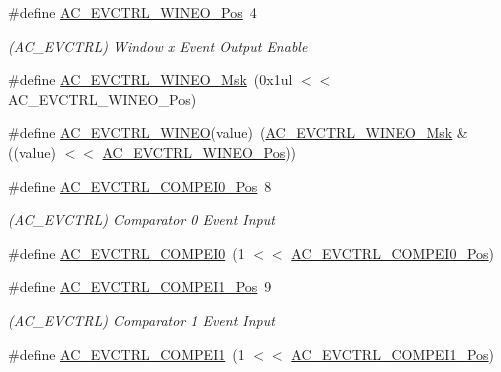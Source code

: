 \begin{DoxyCompactItemize}
\#define \mbox{\hyperlink{group___s_a_m_d21___a_c_ga1afab4ba445e18743d95471ac63fc5f3}{A\+C\+\_\+\+E\+V\+C\+T\+R\+L\+\_\+\+W\+I\+N\+E\+O\+\_\+\+Pos}}~4
\begin{DoxyCompactList}\small\item\em (A\+C\+\_\+\+E\+V\+C\+T\+RL) Window x Event Output Enable \end{DoxyCompactList}\item 
\#define \mbox{\hyperlink{group___s_a_m_d21___a_c_gacaf33f5e882907efaa5d1796b80c8eb8}{A\+C\+\_\+\+E\+V\+C\+T\+R\+L\+\_\+\+W\+I\+N\+E\+O\+\_\+\+Msk}}~(0x1ul $<$$<$ A\+C\+\_\+\+E\+V\+C\+T\+R\+L\+\_\+\+W\+I\+N\+E\+O\+\_\+\+Pos)
\item 
\#define \mbox{\hyperlink{group___s_a_m_d21___a_c_gaa9bf3767e1890a5777a9299e4fc7e812}{A\+C\+\_\+\+E\+V\+C\+T\+R\+L\+\_\+\+W\+I\+N\+EO}}(value)~(\mbox{\hyperlink{group___s_a_m_d21___a_c_gacaf33f5e882907efaa5d1796b80c8eb8}{A\+C\+\_\+\+E\+V\+C\+T\+R\+L\+\_\+\+W\+I\+N\+E\+O\+\_\+\+Msk}} \& ((value) $<$$<$ \mbox{\hyperlink{group___s_a_m_d21___a_c_ga1afab4ba445e18743d95471ac63fc5f3}{A\+C\+\_\+\+E\+V\+C\+T\+R\+L\+\_\+\+W\+I\+N\+E\+O\+\_\+\+Pos}}))
\item 
\#define \mbox{\hyperlink{group___s_a_m_d21___a_c_ga586fb057733a1c4b9f7c81586a2f6854}{A\+C\+\_\+\+E\+V\+C\+T\+R\+L\+\_\+\+C\+O\+M\+P\+E\+I0\+\_\+\+Pos}}~8
\begin{DoxyCompactList}\small\item\em (A\+C\+\_\+\+E\+V\+C\+T\+RL) Comparator 0 Event Input \end{DoxyCompactList}\item 
\#define \mbox{\hyperlink{group___s_a_m_d21___a_c_ga14b2e19c7520b2b8d2f53bd753003601}{A\+C\+\_\+\+E\+V\+C\+T\+R\+L\+\_\+\+C\+O\+M\+P\+E\+I0}}~(1 $<$$<$ \mbox{\hyperlink{group___s_a_m_d21___a_c_ga586fb057733a1c4b9f7c81586a2f6854}{A\+C\+\_\+\+E\+V\+C\+T\+R\+L\+\_\+\+C\+O\+M\+P\+E\+I0\+\_\+\+Pos}})
\item 
\#define \mbox{\hyperlink{group___s_a_m_d21___a_c_ga744dba4ce32648fec57677d38bcf2be5}{A\+C\+\_\+\+E\+V\+C\+T\+R\+L\+\_\+\+C\+O\+M\+P\+E\+I1\+\_\+\+Pos}}~9
\begin{DoxyCompactList}\small\item\em (A\+C\+\_\+\+E\+V\+C\+T\+RL) Comparator 1 Event Input \end{DoxyCompactList}\item 
\#define \mbox{\hyperlink{group___s_a_m_d21___a_c_gaa89dca59d1c1b90d3c7f343711b89c23}{A\+C\+\_\+\+E\+V\+C\+T\+R\+L\+\_\+\+C\+O\+M\+P\+E\+I1}}~(1 $<$$<$ \mbox{\hyperlink{group___s_a_m_d21___a_c_ga744dba4ce32648fec57677d38bcf2be5}{A\+C\+\_\+\+E\+V\+C\+T\+R\+L\+\_\+\+C\+O\+M\+P\+E\+I1\+\_\+\+Pos}})

\end{DoxyCompactItemize}
